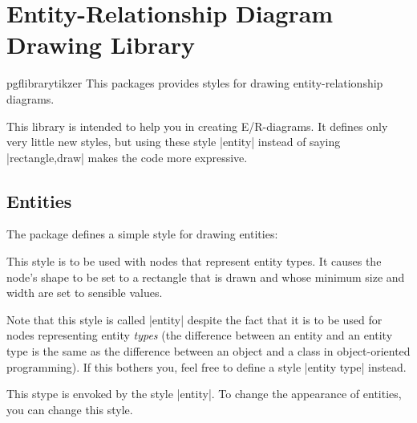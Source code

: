 %



\section{Entity-Relationship Diagram Drawing Library}

\begin{package}{pgflibrarytikzer}
  This packages provides styles for drawing entity-relationship
  diagrams. 
\end{package}

This library is intended to help you in creating E/R-diagrams. It defines
only very little new styles, but using these style |entity| instead of
saying |rectangle,draw| makes the code more expressive.


\subsection{Entities}

The package defines a simple style for drawing entities:

\begin{itemize}
  This style is to be used with nodes that represent entity types. It
  causes the node's shape to be set to a rectangle that is drawn and
  whose minimum size and width are set to sensible values.

  Note that this style is called |entity| despite the fact that it is
  to be used for nodes representing entity \emph{types} (the
  difference between an entity and an entity type is the same as the
  difference between an object and a class in object-oriented
  programming). If this bothers you, feel free to define a style
  |entity type| instead.
\begin{codeexample}[]
\end{codeexample}
  
  This stype is envoked by the style |entity|. To change the
  appearance of entities, you can change this style.
\begin{codeexample}[]
\end{codeexample}
\end{itemize}



